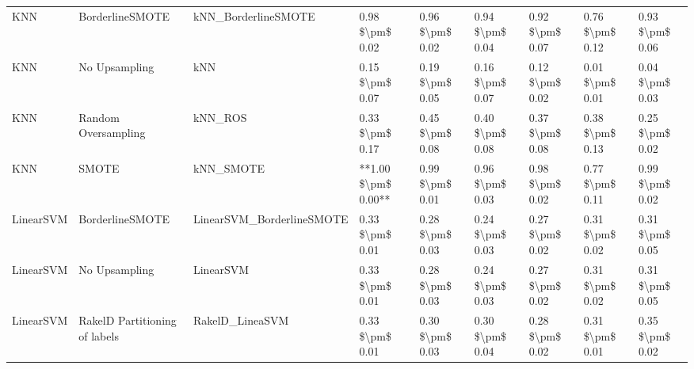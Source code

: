 \begin{tabular}{lllllllll}
                            KNN &               BorderlineSMOTE &                          kNN\_BorderlineSMOTE &     0.98 \$\textbackslash pm\$ 0.02 &           0.96 \$\textbackslash pm\$ 0.02 &       0.94 \$\textbackslash pm\$ 0.04 &        0.92 \$\textbackslash pm\$ 0.07 &                         0.76 \$\textbackslash pm\$ 0.12 & 0.93 \$\textbackslash pm\$ 0.06 \\
                            KNN &                 No Upsampling &                                          kNN &     0.15 \$\textbackslash pm\$ 0.07 &           0.19 \$\textbackslash pm\$ 0.05 &       0.16 \$\textbackslash pm\$ 0.07 &        0.12 \$\textbackslash pm\$ 0.02 &                         0.01 \$\textbackslash pm\$ 0.01 & 0.04 \$\textbackslash pm\$ 0.03 \\
                            KNN &           Random Oversampling &                                      kNN\_ROS &     0.33 \$\textbackslash pm\$ 0.17 &           0.45 \$\textbackslash pm\$ 0.08 &       0.40 \$\textbackslash pm\$ 0.08 &        0.37 \$\textbackslash pm\$ 0.08 &                         0.38 \$\textbackslash pm\$ 0.13 & 0.25 \$\textbackslash pm\$ 0.02 \\
                            KNN &                         SMOTE &                                    kNN\_SMOTE & **1.00 \$\textbackslash pm\$ 0.00** &           0.99 \$\textbackslash pm\$ 0.01 &       0.96 \$\textbackslash pm\$ 0.03 &        0.98 \$\textbackslash pm\$ 0.02 &                         0.77 \$\textbackslash pm\$ 0.11 & 0.99 \$\textbackslash pm\$ 0.02 \\
                      LinearSVM &               BorderlineSMOTE &                    LinearSVM\_BorderlineSMOTE &     0.33 \$\textbackslash pm\$ 0.01 &           0.28 \$\textbackslash pm\$ 0.03 &       0.24 \$\textbackslash pm\$ 0.03 &        0.27 \$\textbackslash pm\$ 0.02 &                         0.31 \$\textbackslash pm\$ 0.02 & 0.31 \$\textbackslash pm\$ 0.05 \\
                      LinearSVM &                 No Upsampling &                                    LinearSVM &     0.33 \$\textbackslash pm\$ 0.01 &           0.28 \$\textbackslash pm\$ 0.03 &       0.24 \$\textbackslash pm\$ 0.03 &        0.27 \$\textbackslash pm\$ 0.02 &                         0.31 \$\textbackslash pm\$ 0.02 & 0.31 \$\textbackslash pm\$ 0.05 \\
                      LinearSVM & RakelD Partitioning of labels &                              RakelD\_LineaSVM &     0.33 \$\textbackslash pm\$ 0.01 &           0.30 \$\textbackslash pm\$ 0.03 &       0.30 \$\textbackslash pm\$ 0.04 &        0.28 \$\textbackslash pm\$ 0.02 &                         0.31 \$\textbackslash pm\$ 0.01 & 0.35 \$\textbackslash pm\$ 0.02 \\

\end{tabular}
